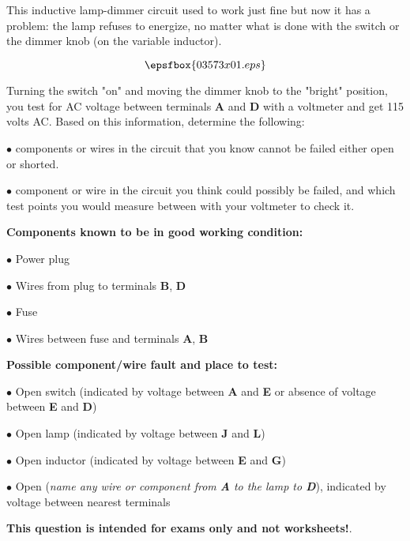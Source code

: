 

This inductive lamp-dimmer circuit used to work just fine but now it has a problem: the lamp refuses to energize, no matter what is done with the switch or the dimmer knob (on the variable inductor).

$$\epsfbox{03573x01.eps}$$

Turning the switch "on" and moving the dimmer knob to the "bright" position, you test for AC voltage between terminals {\bf A} and {\bf D} with a voltmeter and get 115 volts AC.  Based on this information, determine the following:

\vskip 10pt

\medskip
\item{$\bullet$}  components or wires in the circuit that you know cannot be failed either open or shorted.
\vskip 40pt
\item{$\bullet$}  component or wire in the circuit you think could possibly be failed, and which test points you would measure between with your voltmeter to check it.
\medskip







\goodbreak
\noindent
{\bf Components known to be in good working condition:}

\medskip
\item{$\bullet$} Power plug
\item{$\bullet$} Wires from plug to terminals {\bf B}, {\bf D}
\item{$\bullet$} Fuse
\item{$\bullet$} Wires between fuse and terminals {\bf A}, {\bf B}
\medskip

\vskip 10pt

\goodbreak
\noindent
{\bf Possible component/wire fault and place to test:}

\medskip
\item{$\bullet$} Open switch (indicated by voltage between {\bf A} and {\bf E} or absence of voltage between {\bf E} and {\bf D})
\item{$\bullet$} Open lamp (indicated by voltage between {\bf J} and {\bf L})
\item{$\bullet$} Open inductor (indicated by voltage between {\bf E} and {\bf G})
\item{$\bullet$} Open ({\it name any wire or component from {\bf A} to the lamp to {\bf D}}), indicated by voltage between nearest terminals
\medskip







{\bf This question is intended for exams only and not worksheets!}.



